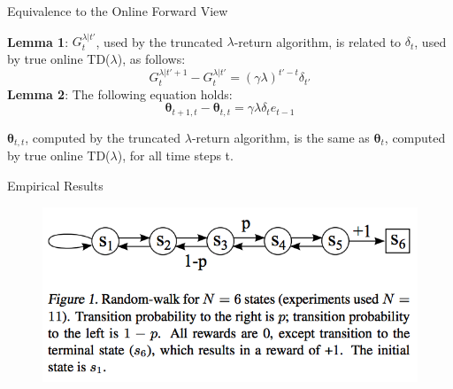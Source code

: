 \documentclass[xcolor={table}]{beamer}
\begin{document}
\begin{frame}{Equivalence to the Online Forward View}
    \begin{lemma}
        \textbf{Lemma 1}: $G_{t}^{\lambda|t'}$, used by the truncated $\lambda$-return algorithm, is related to $\delta_{t}$, used by true online  TD($\lambda$), as follows:
        \begin{equation*}
            G_{t}^{\lambda|t'+1} - G_{t}^{\lambda|t'} = (\gamma\lambda)^{t'-t}\delta_{t'}
        \end{equation*}
        \textbf{Lemma 2}:
        The following equation holds:
        \begin{equation*}
            \boldsymbol{\theta}_{t+1,t} - \boldsymbol{\theta}_{t,t} = \gamma\lambda\delta_{t}e_{t-1}
        \end{equation*}
    \end{lemma}
    \begin{theorem}
        $\boldsymbol{\theta}_{t,t}$, computed by the truncated $\lambda$-return algorithm, is the same as $\boldsymbol{\theta}_{t}$, computed by true online TD($\lambda$), for all time steps t.
    \end{theorem}
\end{frame}

\begin{frame}{Empirical Results}
    \begin{figure}
        \centering
        \includegraphics[scale = 0.5]{random-walk.png}
        \label{fig:my_label}
    \end{figure}
\end{frame}
\end{document}

